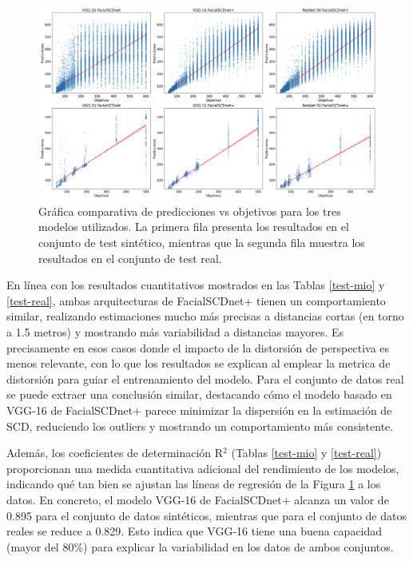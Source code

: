 \begin{figure}[h]
	\centering
	\includegraphics[width=\textwidth]{imagenes/cap5/comp_etiquetas.png}
	\caption[Comparación etiquetas de test.]{Gráfica comparativa de predicciones vs objetivos para los tres modelos utilizados. La primera fila presenta los resultados en el conjunto de test sintético, mientras que la segunda fila muestra los resultados en el conjunto de test real.}
	\label{fig34}
\end{figure}

En línea con los resultados cuantitativos mostrados en las Tablas \ref{test-mio} y \ref{test-real}, ambas arquitecturas de FacialSCDnet+ tienen un comportamiento similar, realizando estimaciones mucho más precisas a distancias cortas (en torno a 1.5 metros) y mostrando más variabilidad a distancias mayores. Es precisamente en esos casos donde el impacto de la distorsión de perspectiva es menos relevante, con lo que los resultados se explican al emplear la metrica de distorsión para guiar el entrenamiento del modelo. Para el conjunto de datos real se puede extraer una conclusión similar, destacando cómo el modelo basado en VGG-16 de FacialSCDnet+ parece minimizar la dispersión en la estimación de SCD, reduciendo los outliers y mostrando un comportamiento más consistente.

Además, los coeficientes de determinación R$^2$ (Tablas \ref{test-mio} y \ref{test-real}) proporcionan una medida cuantitativa adicional del rendimiento de los modelos, indicando qué tan bien se ajustan las líneas de regresión de la Figura \ref{fig34} a los datos. En concreto, el modelo VGG-16 de FacialSCDnet+ alcanza un valor de 0.895 para el conjunto de datos sintéticos, mientras que para el conjunto de datos reales se reduce a 0.829. Esto indica que VGG-16 tiene una buena capacidad (mayor del 80\%) para explicar la variabilidad en los datos de ambos conjuntos.